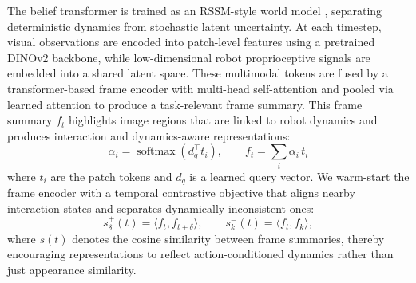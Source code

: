 \documentclass[conference]{IEEEtran}
\begin{document}
The belief transformer is trained as an RSSM-style world model \cite{chen2022transdreamer,chaudhry2026semantic}, separating deterministic dynamics from stochastic latent uncertainty. At each timestep, visual observations are encoded into patch-level features using a pretrained DINOv2 \cite{oquab2023dinov2} backbone, while low-dimensional robot proprioceptive signals are embedded into a shared latent space. These multimodal tokens are fused by a transformer-based frame encoder with multi-head self-attention and pooled via learned attention to produce a task-relevant frame summary. This frame summary $f_t$ highlights image regions that are linked to robot dynamics and produces interaction and dynamics-aware representations: 
\[
\alpha_i = \operatorname{softmax}\!\left(d_q^\top t_i\right), 
\qquad
f_t = \sum_i \alpha_i \, t_i
\]
where $t_i$ are the patch tokens and $d_q$ is a learned query vector.
We warm-start the frame encoder with a temporal contrastive objective that aligns nearby interaction states and separates dynamically inconsistent ones:
\[
s^+_{\delta}(t) = \langle f_t, f_{t+\delta} \rangle, 
\qquad
s^-_k(t) = \langle f_t, f_k \rangle,
\]
where $s(t)$ denotes the cosine similarity between frame summaries, thereby encouraging representations to reflect action-conditioned dynamics rather than just appearance similarity.
\end{document}
